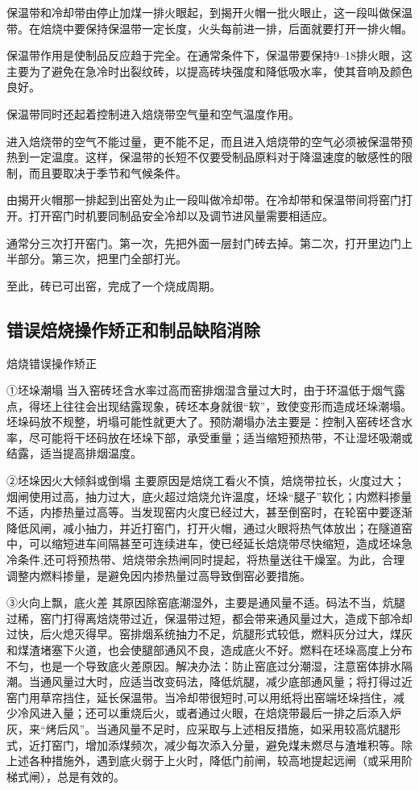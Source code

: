 \documentclass{ctexbook}
\begin{document}
保温带和冷却带由停止加煤一排火眼起，到揭开火帽一批火眼止，这一段叫做保温带。在焙烧中要保持保温带一定长度，火头每前进一排，后面就要打开一排火帽。

保温带作用是使制品反应趋于完全。在通常条件下，保温带要保持9--18排火眼，这主要为了避免在急冷时出裂纹砖，以提高砖块强度和降低吸水率，使其音响及颜色良好。

保温带同时还起着控制进入焙烧带空气量和空气温度作用。

进入焙烧带的空气不能过量，更不能不足，而且进入焙烧带的空气必须被保温带预热到一定温度。这样，保温带的长短不仅要受制品原料对于降温速度的敏感性的限制，而且要取决于季节和气候条件。

由揭开火帽那一排起到出窑处为止一段叫做冷却带。在冷却带和保温带间将窑门打开。打开窑门时机要同制品安全冷却以及调节进风量需要相适应。

通常分三次打开窑门。第一次，先把外面一层封门砖去掉。第二次，打开里边门上半部分。第三次，把里门全部打光。

至此，砖已可出窑，完成了一个烧成周期。
\subsection{错误焙烧操作矫正和制品缺陷消除}
焙烧错误操作矫正

①坯垛潮塌 当入窑砖坯含水率过高而窑排烟湿含量过大时，由于环温低于烟气露点，得坯上往往会出现结露现象，砖坯本身就很“软”，致使变形而造成坯垛潮塌。坯垛码放不规整，坍塌可能性就更大了。预防潮塌办法主要是：控制入窑砖坯含水率，尽可能将干坯码放在坯垛下部，承受重量；适当缩短预热带，不让湿坯吸潮或结露，适当提高排烟温度。

②坯垛因火大倾斜或倒塌 主要原因是焙烧工看火不慎，焙烧带拉长，火度过大；烟闸使用过高，抽力过大，底火超过焙烧允许温度，坯垛“腿子”软化；内燃料掺量不适，内掺热量过高等。当发现窑内火度已经过大，甚至倒窑时，在轮窑中要逐渐降低风闸，减小抽力，并近打窑门，打开火帽，通过火眼将热气体放出；在隧道窑中，可以缩短进车间隔甚至可连续进车，使已经延长焙烧带尽快缩短，造成坯垛急冷条件,还可将预热带、焙烧带余热闸同时提起，将热量送往干燥室。为此，合理调整内燃料掺量，是避免因内掺热量过高导致倒窑必要措施。

③火向上飘，底火差 其原因除窑底潮湿外，主要是通风量不适。码法不当，炕腿过稀，窑门打得离焙烧带过近，保温带过短，都会带来通风量过大，造成下部冷却过快，后火熄灭得早。窑排烟系统抽力不足，炕腿形式较低，燃料灰分过大，煤灰和煤渣堵塞下火道，也会使腿部通风不良，造成底火不好。燃料在坯垛高度上分布不匀，也是一个导致底火差原因。解决办法：防止窑底过分潮湿，注意窑体排水隔潮。当通风量过大时，应适当改变码法，降低炕腿，减少底部通风量；将打得过近窑门用草帘挡住，延长保温带。当冷却带很短时,可以用纸将出窑端坯垛挡住，减少冷风进入量；还可以重烧后火，或者通过火眼，在焙烧带最后一排之后添入炉灰，来“烤后风”。当通风量不足时，应采取与上述相反措施，如采用较高炕腿形式，近打窑门，增加添煤频次，减少每次添入分量，避免煤未燃尽与渣堆积等。除上述各种措施外，遇到底火弱于上火时，降低门前闸，较高地提起远闸（或采用阶梯式闸），总是有效的。
\end{document}
